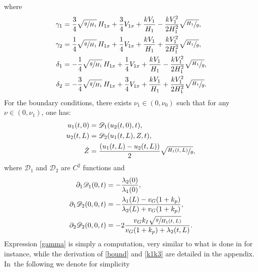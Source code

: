 \documentclass[JEP,XML,SOM,Unicode]{cedram}
\let\mathcal\mathscr
\theoremstyle{definition}
\begin{document}
where\vspace*{-7pt}
\begin{equation}
\begin{split}
\gamma_{1}&=\frac{3}{4}\sqrt{\sfrac{g}{H_{1}}}\,H_{1x}+\frac{3}{4}V_{1x}+\frac{kV_{1}}{H_{1}}-\frac{kV_{1}^{2}}{2H_{1}^{2}}\sqrt{\sfrac{H_{1}}{g}},\\
\gamma_{2}&=\frac{1}{4}\sqrt{\sfrac{g}{H_{1}}}\,H_{1x}+\frac{1}{4}V_{1x}+\frac{kV_{1}}{H_{1}}+\frac{kV_{1}^{2}}{2H_{1}^{2}}\sqrt{\sfrac{H_{1}}{g}},\\
\delta_{1}&=-\frac{1}{4}\sqrt{\sfrac{g}{H_{1}}}\,H_{1x}+\frac{1}{4}V_{1x}+\frac{kV_{1}}{H_{1}}-\frac{kV_{1}^{2}}{2H_{1}^{2}}\sqrt{\sfrac{H_{1}}{g}},\\
\delta_{2}&=-\frac{3}{4}\sqrt{\sfrac{g}{H_{1}}}\,H_{1x}+\frac{3}{4}V_{1x}+\frac{kV_{1}}{H_{1}}+\frac{kV_{1}^{2}}{2H_{1}^{2}}\sqrt{\sfrac{H_{1}}{g}}.
\end{split}
\label{gamma}
\end{equation}
{For} the boundary conditions, there exists $\nu_{1}\in(0,\nu_{0})$ such that for any $\nu\in(0,\nu_{1})$, one has:\vspace*{-5pt}
\begin{equation}
\begin{split}
u_{1}(t,0)&=\mathcal{D}_{1}(u_{2}(t,0),t),\\
u_{2}(t,L)&=\mathcal{D}_{2}(u_{1}(t,L),Z,t),\\
\dot Z&=\frac{(u_{1}(t,L)-u_{2}(t,L))}{2}\sqrt{\sfrac{H_{1}(t,L)}{g}},
\end{split}
\label{bound}
\end{equation}
where $\mathcal{D}_{1}$ and $\mathcal{D}_{2}$ are $C^{2}$ functions and\vspace*{-5pt}
\begin{equation}
\begin{split}
\partial_{1}\mathcal{D}_{1}(0,t)&=-\frac{\lambda_{2}(0)}{\lambda_{1}(0)},\\
\partial_{1}\mathcal{D}_{2}(0,0,t)&=-\frac{\lambda_{1}(L)-v_{G}(1+k_{p})}{\lambda_{2}(L)+v_{G}(1+k_{p})},\\
\partial_{2}\mathcal{D}_{2}(0,0,t)&=-2\frac{v_{G}k_{I}\sqrt{\sfrac{g}{H_{1}(t,L)}}}{v_{G}(1+k_{p})+\lambda_{2}(t,L)}.
\end{split}
\label{k1k3}
\end{equation}
Expression \eqref{gamma} is simply a computation, very similar to what is done in \cite{HS} for instance, while the derivation of \eqref{bound} and \eqref{k1k3} are detailed in the appendix. In~the following we denote for simplicity
\end{document}
